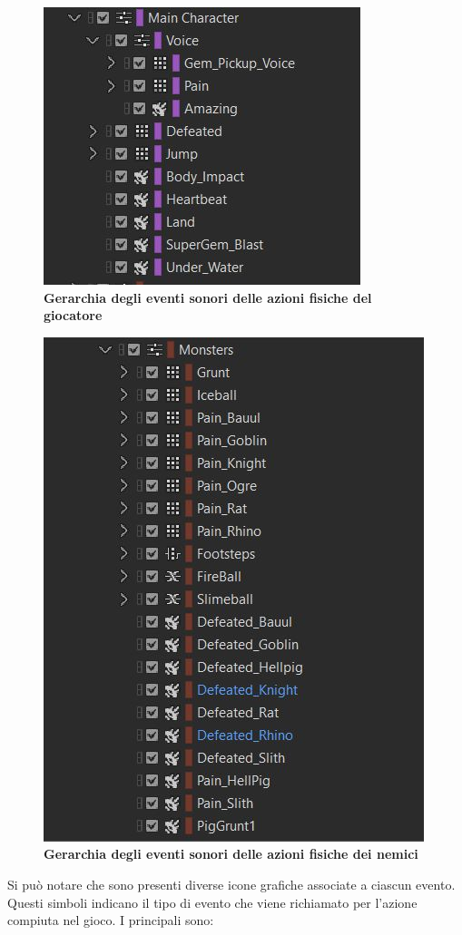 	\begin{figure}[h]
		\begin{center}
			\includegraphics[width=.47\textwidth]{img/image5.jpg}
			\caption{\textbf{Gerarchia degli eventi sonori delle azioni fisiche del giocatore}}
			\label{gr01}
		\end{center}
	\end{figure}
	
	\begin{figure}[h]
		\begin{center}
			\includegraphics[width=.47\textwidth]{img/image6.jpg}
			\caption{\textbf{Gerarchia degli eventi sonori delle azioni fisiche dei nemici}}
				\label{gr01}
		\end{center}
	\end{figure}
	
	Si può notare che sono presenti diverse icone grafiche associate a ciascun evento. Questi simboli indicano il tipo di evento che viene richiamato per l'azione compiuta nel gioco. I principali sono:
	
